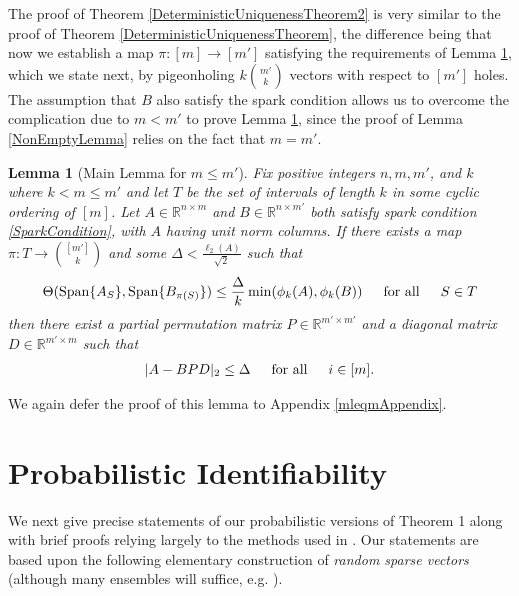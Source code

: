 \documentclass[journal, onecolumn]{IEEEtran}
\newtheorem{lemma}{Lemma}
\begin{document}
The proof of Theorem \ref{DeterministicUniquenessTheorem2} is very similar to the proof of Theorem \ref{DeterministicUniquenessTheorem}, the difference being that now we establish a map $\pi: [m] \to [m']$ satisfying the requirements of Lemma \ref{MainLemma2}, which we state next, by pigeonholing $k{m' \choose k}$ vectors with respect to $[m']$ holes. The assumption that $B$ also satisfy the spark condition allows us to overcome the complication due to $m < m'$ to prove Lemma \ref{MainLemma2}, since the proof of Lemma \ref{NonEmptyLemma} relies on the fact that $m = m'$. 

\begin{lemma}[Main Lemma for $m \leq m'$]\label{MainLemma2}
Fix positive integers $n, m, m'$, and $k$ where $k < m \leq m'$ and let $T$ be the set of intervals of length $k$ in some cyclic ordering of $[m]$. Let $A \in \mathbb{R}^{n \times m}$ and $B \in \mathbb{R}^{n \times m'}$ both satisfy spark condition \eqref{SparkCondition}, with $A$ having unit norm columns. If there exists a map $\pi: T \to {[m'] \choose k}$ and some $\Delta < \frac{\ell_{2}(A)}{\sqrt{2}}$ such that 
\begin{equation}\label{GapUpperBound2}
\Theta(\text{Span}\{A_{S}\}, \text{Span}\{B_{\pi(S)}\}) \leq \frac{ \Delta }{k} \min(\phi_k(A), \phi_k(B)) \indent \text{for all} \indent S \in T
\end{equation}
%
then there exist a partial permutation matrix $P \in \mathbb{R}^{m' \times m'}$ and a diagonal matrix $D \in \mathbb{R}^{m' \times m}$ such that
\begin{align}
|A - BPD|_2 \leq \Delta \indent \text{for all} \indent i \in [m].
\end{align}
\end{lemma}

We again defer the proof of this lemma to Appendix \ref{mleqmAppendix}.



\section{Probabilistic Identifiability}\label{PUT}

We next give precise statements of our probabilistic versions of Theorem 1 along with brief proofs relying largely to the methods used in \cite{Hillar15}. Our statements are based upon the following elementary construction of \emph{random sparse vectors} (although many ensembles will suffice, e.g. \cite{Biarunik}).
\end{document}
